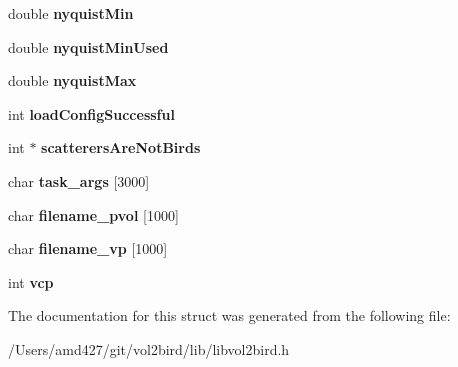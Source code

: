 \begin{DoxyCompactItemize}
double {\bfseries nyquist\+Min}
\item 
\mbox{\label{structvol2birdMisc_a99544b3e90288e8041c38cebd9c41269}} 
double {\bfseries nyquist\+Min\+Used}
\item 
\mbox{\label{structvol2birdMisc_a89228d55a45587cceb3d0b66d54840e6}} 
double {\bfseries nyquist\+Max}
\item 
\mbox{\label{structvol2birdMisc_aac36ceabd2c74989463a6c48d057ce4c}} 
int {\bfseries load\+Config\+Successful}
\item 
\mbox{\label{structvol2birdMisc_a1ca14415312da0eb0484491b5f6b4b74}} 
int $\ast$ {\bfseries scatterers\+Are\+Not\+Birds}
\item 
\mbox{\label{structvol2birdMisc_af50602189c661f03cecadbfe38320ec8}} 
char {\bfseries task\+\_\+args} \mbox{[}3000\mbox{]}
\item 
\mbox{\label{structvol2birdMisc_a3a3582478ff752ad3c3768fd3373417e}} 
char {\bfseries filename\+\_\+pvol} \mbox{[}1000\mbox{]}
\item 
\mbox{\label{structvol2birdMisc_a35163f02a8c81575cd377bd640c525c1}} 
char {\bfseries filename\+\_\+vp} \mbox{[}1000\mbox{]}
\item 
\mbox{\label{structvol2birdMisc_a4628160d0818b7480f920a82d25fc7af}} 
int {\bfseries vcp}
\end{DoxyCompactItemize}


The documentation for this struct was generated from the following file\+:\begin{DoxyCompactItemize}
\item 
/\+Users/amd427/git/vol2bird/lib/libvol2bird.\+h\end{DoxyCompactItemize}
